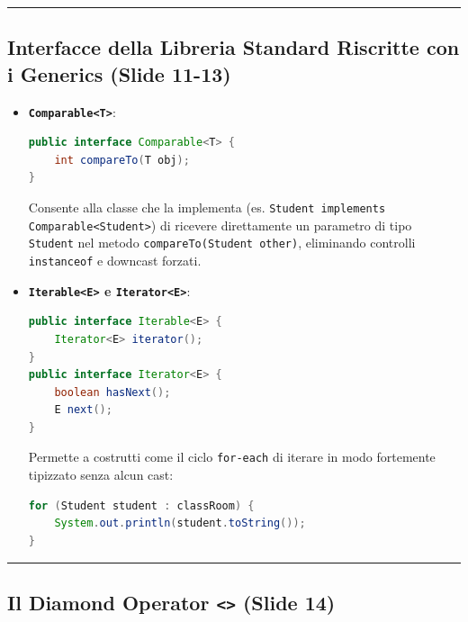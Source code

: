 \documentclass[11pt,a4paper,oneside]{report}
\newcommand{\passthrough}[1]{#1}
\begin{document}
\begin{center}\rule{0.5\linewidth}{0.5pt}\end{center}

\subsection{Interfacce della Libreria Standard Riscritte con i Generics
(Slide
11-13)}\label{chap14_interfacce-della-libreria-standard-riscritte-con-i-generics-slide-11-13}

\begin{itemize}
\item
  \textbf{\passthrough{\lstinline!Comparable<T>!}}:

\begin{lstlisting}[language=Java]
public interface Comparable<T> {
    int compareTo(T obj);
}
\end{lstlisting}

  Consente alla classe che la implementa (es.
  \passthrough{\lstinline!Student implements Comparable<Student>!}) di
  ricevere direttamente un parametro di tipo
  \passthrough{\lstinline!Student!} nel metodo
  \passthrough{\lstinline!compareTo(Student other)!}, eliminando
  controlli \passthrough{\lstinline!instanceof!} e downcast forzati.
\item
  \textbf{\passthrough{\lstinline!Iterable<E>!} e
  \passthrough{\lstinline!Iterator<E>!}}:

\begin{lstlisting}[language=Java]
public interface Iterable<E> {
    Iterator<E> iterator();
}
public interface Iterator<E> {
    boolean hasNext();
    E next();
}
\end{lstlisting}

  Permette a costrutti come il ciclo \passthrough{\lstinline!for-each!}
  di iterare in modo fortemente tipizzato senza alcun cast:

\begin{lstlisting}[language=Java]
for (Student student : classRoom) {
    System.out.println(student.toString());
}
\end{lstlisting}
\end{itemize}

\begin{center}\rule{0.5\linewidth}{0.5pt}\end{center}

\subsection{\texorpdfstring{Il Diamond Operator
\texttt{\textless{}\textgreater{}} (Slide
14)}{Il Diamond Operator \textless\textgreater{} (Slide 14)}}\label{chap14_il-diamond-operator-slide-14}
\end{document}
